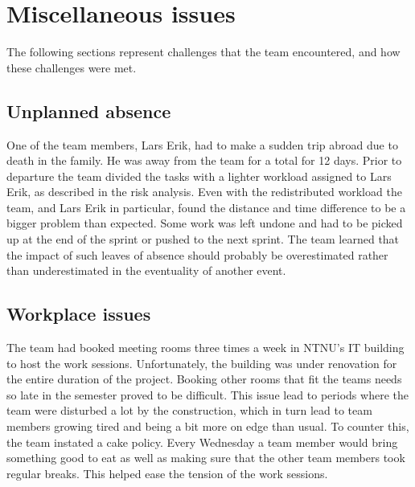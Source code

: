 \section{Miscellaneous issues}
The following sections represent challenges that the team encountered, and how these challenges were met.

\subsection{Unplanned absence}
One of the team members, Lars Erik, had to make a sudden trip abroad due to
death in the family. He was away from the team for a total for 12 days. Prior
to departure the team divided the tasks with a lighter workload assigned to Lars
Erik, as described in the risk analysis. Even with the redistributed workload
the team, and Lars Erik in particular, found the distance and time difference to
be a bigger problem than expected. Some work was left undone and had to be
picked up at the end of the sprint or pushed to the next sprint. The team
learned that the impact of such leaves of absence should probably be
overestimated rather than underestimated in the eventuality of another event.

\subsection{Workplace issues}
The team had booked meeting rooms three times a week in NTNU's IT building to host the work sessions. Unfortunately, the building was under renovation for the entire duration of the project. Booking other rooms that fit the teams needs so late in the semester proved to be difficult. This issue lead to periods where the team were disturbed a lot by the construction, which in turn lead to team members growing tired and being a bit more on edge than usual. To counter this, the team instated a cake policy. Every Wednesday a team member would bring something good to eat as well as making sure that the other team members took regular breaks. This helped ease the tension of the work sessions.

\begin{comment}
\subsection{Excessive discussion}
The team has seen that much time is being spent discussing a lot. The discussion was of importance, but it drained too much of the time. To solve this, it was decided that there should be set a certain amount of time for the discussions. Should the discussions last longer than the time set, the project leader's task was to focus on ending the discussions, and instead perform a democratic vote based on the arguments that were presented. 
\end{comment}

